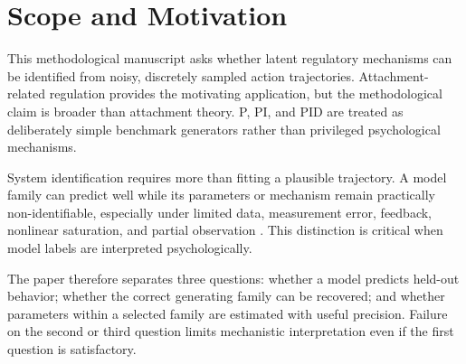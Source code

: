 \section{Scope and Motivation}

This methodological manuscript asks whether latent regulatory mechanisms can be identified from noisy, discretely sampled action trajectories. Attachment-related regulation provides the motivating application, but the methodological claim is broader than attachment theory. P, PI, and PID are treated as deliberately simple benchmark generators rather than privileged psychological mechanisms.

System identification requires more than fitting a plausible trajectory. A model family can predict well while its parameters or mechanism remain practically non-identifiable, especially under limited data, measurement error, feedback, nonlinear saturation, and partial observation \parencite{ljung1999systemidentification,lam2022identifiability}. This distinction is critical when model labels are interpreted psychologically.

The paper therefore separates three questions: whether a model predicts held-out behavior; whether the correct generating family can be recovered; and whether parameters within a selected family are estimated with useful precision. Failure on the second or third question limits mechanistic interpretation even if the first question is satisfactory.
